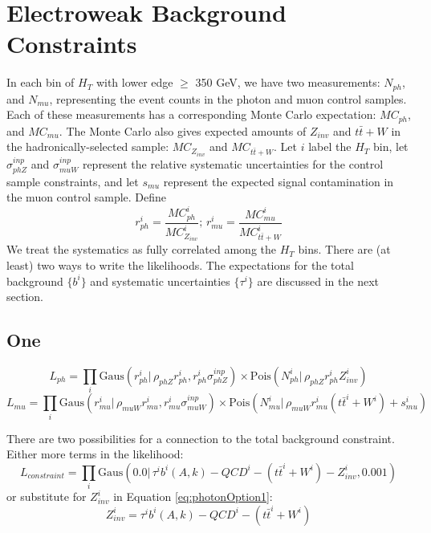 \section{Electroweak Background Constraints}
In each bin of $H_T$ with lower edge $\ge$ 350 GeV, we have two measurements: $N_{ph}$, and $N_{mu}$,
representing the event counts in the photon and muon control samples.  Each of these measurements has a 
corresponding Monte Carlo expectation: $MC_{ph}$, and $MC_{mu}$.  The Monte Carlo also gives
expected amounts of $Z_{inv}$ and $t\bar{t}+W$ in the hadronically-selected sample: $MC_{Z_{inv}}$ and $MC_{t\bar{t}+W}$.
Let $i$ label the $H_T$ bin, let $\sigma_{phZ}^{inp}$ and $\sigma_{muW}^{inp}$ represent the relative 
systematic uncertainties for the control sample constraints, and let $s_{mu}$ represent the expected signal contamination in the muon control sample.
Define 
\begin{equation}
r_{ph}^i = \frac{MC_{ph}^i}{MC_{Z_{inv}}^i};\, r_{mu}^i = \frac{MC_{mu}^i}{MC_{t\bar{t}+W}^i}
\end{equation}
We treat the systematics as fully correlated among the $H_T$ bins.  There are (at least) two ways to write the likelihoods.  The expectations for the total background $\{b^{i}\}$ and systematic uncertainties $\{\tau^{i}\}$ are discussed in the next section.

\subsection{One}

\begin{equation}
\label{eq:photonOption1}
L_{ph}=\prod_i \mathrm{Gaus}( r_{ph}^i |\,\rho_{phZ} r_{ph}^i, r_{ph}^i \sigma_{phZ}^{inp}) \times \mathrm{Pois}(N_{ph}^i |\, \rho_{phZ} r_{ph}^{i} Z_{inv}^{i})
\end{equation}
\begin{equation}
L_{mu}=\prod_i \mathrm{Gaus}( r_{mu}^i |\,\rho_{muW} r_{mu}^i, r_{mu}^i \sigma_{muW}^{inp}) \times \mathrm{Pois}(N_{mu}^i |\, \rho_{muW} r_{mu}^{i} (t\bar{t}^i+W^i) + s_{mu}^i)
\end{equation}

There are two possibilities for a connection to the total background constraint.  Either more terms in the likelihood:
\begin{equation}
L_{constraint}=\prod_i \mathrm{Gaus}( 0.0 |\, \tau^i b^{i}(A,k) - QCD^{i} - (t\bar{t}^i+W^i) - Z_{inv}^{i}, 0.001)
\end{equation}
or substitute for $Z_{inv}^i$ in Equation \ref{eq:photonOption1}:
\begin{equation}
Z_{inv}^{i} = \tau^i b^{i}(A,k) - QCD^{i} - (t\bar{t}^i+W^i)
\end{equation}


